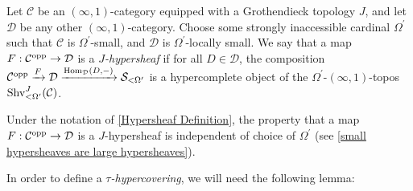 \documentclass[10pt]{article}
\newcommand{\mS}{\mathcal S}
\newcommand{\C}{\mathcal C}
\newcommand{\cD}{\mathcal{D}}
\theoremstyle{witharg}
\theoremstyle{witharg}
\theoremstyle{witharg2}
\begin{document}
\begin{definition}{}\label{Hypersheaf Definition}

    Let $\C$ be an $(\infty,1)$-category equipped with a Grothendieck topology $J$, and let $\cD$ be any other $(\infty,1)$-category. Choose some strongly inaccessible cardinal $\Omega^\prime$ such that $\C$ is $\Omega^\prime$-small, and $\cD$ is $\Omega^\prime$-locally small. We say that a map $F:\C^{\textnormal{opp}}\rightarrow \cD$ is a \emph{$J$-hypersheaf} if for all $D\in \cD$, the composition $\C^{\textnormal{opp}}\xrightarrow{F}\cD\xrightarrow{\textnormal{Hom}_{\cD}(D,-)}\mS_{<\Omega^\prime}$ is a hypercomplete object of the $\Omega^\prime$-$(\infty,1)$-topos $\textnormal{Shv}^J_{<\Omega^\prime}(\C)$.

\end{definition}

\begin{remark}{}\label{Hypersheaf independent of universe}

    Under the notation of \ref{Hypersheaf Definition}, the property that a map $F:\C^{\textnormal{opp}}\rightarrow \cD$ is a $J$-hypersheaf is independent of choice of $\Omega^\prime$ (see \ref{small hypersheaves are large hypersheaves}).
    
\end{remark}


\noindent In order to define a \emph{$\tau$-hypercovering}, we will need the following lemma: 
\end{document}
